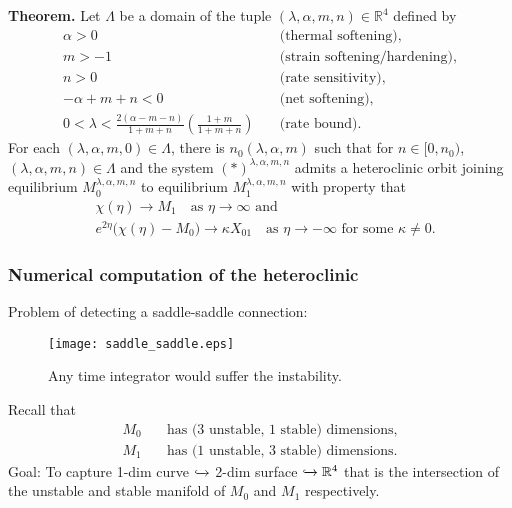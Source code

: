 \documentclass{beamer}
\def\red{\color{red}}
\begin{document}
\begin{frame}
  {\bf Theorem.} Let $\Lambda$ be a domain of the tuple $(\lambda,\alpha,m,n)\in\mathbb{R}^4$ defined by %
  {\scriptsize
 \begin{align*}
  \alpha>0\quad&\text{(thermal softening)},\\
  m>-1 \quad&\text{(strain softening/hardening)}, \\%
  n>0 \quad&\text{(rate sensitivity)},\\ %
  -\alpha+m+n<0 \quad&\text{(net softening)}, \\%
  0< \lambda < \frac{2(\alpha-m-n)}{1+m+n}\left(\frac{1+m}{1+m+n}\right) \quad&\text{(rate bound)}. %
\end{align*}}
 For each $(\lambda,\alpha,m,0) \in \Lambda$, there is $n_0( \lambda,\alpha,m)$ such that for $n \in [0, n_0)$, $(\lambda,\alpha,m,n) \in \Lambda$ and the system $(*)^{\lambda,\alpha,m,n}$ admits a heteroclinic orbit joining equilibrium $M_0^{\lambda,\alpha,m,n}$ to equilibrium $M_1^{\lambda,\alpha,m,n}$ with property that
    \begin{align*}%
        &\chi(\eta) \rightarrow M_1 \quad \text{as $\eta \rightarrow \infty$ and} \\
        &e^{2\eta}\big(\chi(\eta) - M_0\big) \rightarrow \kappa X_{01} \quad \text{as $\eta \rightarrow -\infty$ for some $\kappa\ne0$}.
    \end{align*}
\end{frame}


\begin{frame}
 \frametitle{Numerical computation of the heteroclinic}%
 Problem of detecting a {\red saddle-saddle} connection:
 \begin{figure}
  \texttt{[image: saddle\_saddle.eps]}
  \caption{\scriptsize Any time integrator would suffer the instability.}
 \end{figure}
 {\scriptsize
 Recall that
 \begin{align*}
 M_0 \quad &\text{has (3 unstable, 1 stable) dimensions},\\             
 M_1 \quad &\text{has (1 unstable, 3 stable) dimensions.}
 \end{align*}
 }
 Goal: To capture {\red 1-dim curve} $\xhookrightarrow{}$ 2-dim surface $\xhookrightarrow{}\mathbb{R}^4$ that is the intersection of the unstable and stable manifold of $M_0$ and $M_1$ respectively.
 
\end{frame}
\end{document}

